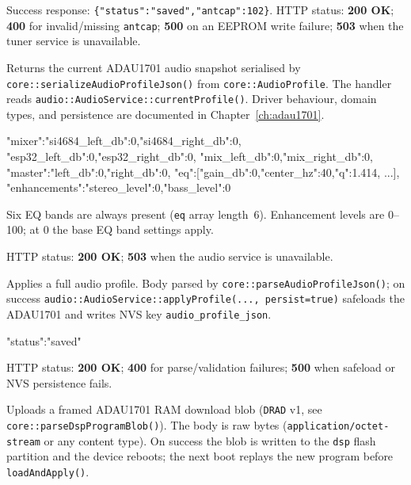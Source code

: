 Success response: \texttt{\{"status":"saved","antcap":102\}}. HTTP status:
\textbf{200 OK}; \textbf{400} for invalid/missing \texttt{antcap};
\textbf{500} on an EEPROM write failure; \textbf{503} when the tuner
service is unavailable.

\label{sec:api-audio-profile-get}

Returns the current ADAU1701 audio snapshot serialised by
\texttt{core::serializeAudioProfileJson()} from \texttt{core::AudioProfile}.
The handler reads \texttt{audio::AudioService::currentProfile()}. Driver
behaviour, domain types, and persistence are documented in
Chapter~\ref{ch:adau1701}.

\begin{drnote}
\begin{drcode}[JSON]
{"mixer":{"si4684_left_db":0,"si4684_right_db":0,
         "esp32_left_db":0,"esp32_right_db":0,
         "mix_left_db":0,"mix_right_db":0},
 "master":{"left_db":0,"right_db":0},
 "eq":[{"gain_db":0,"center_hz":40,"q":1.414}, ...],
 "enhancements":{"stereo_level":0,"bass_level":0}}
\end{drcode}
Six EQ bands are always present (\texttt{eq} array length~6).
Enhancement levels are 0--100; at 0 the base EQ band settings apply.
\end{drnote}

HTTP status: \textbf{200 OK}; \textbf{503} when the audio service is
unavailable.

\label{sec:api-audio-profile-put}

Applies a full audio profile. Body parsed by
\texttt{core::parseAudioProfileJson()}; on success
\texttt{audio::AudioService::applyProfile(..., persist=true)} safeloads
the ADAU1701 and writes NVS key \texttt{audio\_profile\_json}.

\begin{drnote}
\begin{drcode}[JSON]
{"status":"saved"}
\end{drcode}
\end{drnote}

HTTP status: \textbf{200 OK}; \textbf{400} for parse/validation failures;
\textbf{500} when safeload or NVS persistence fails.

\label{sec:api-dsp-program}

Uploads a framed ADAU1701 RAM download blob (\texttt{DRAD} v1, see
\texttt{core::parseDspProgramBlob()}). The body is raw bytes
(\texttt{application/octet-stream} or any content type). On success the blob
is written to the \texttt{dsp} flash partition and the device reboots; the
next boot replays the new program before \texttt{loadAndApply()}.

